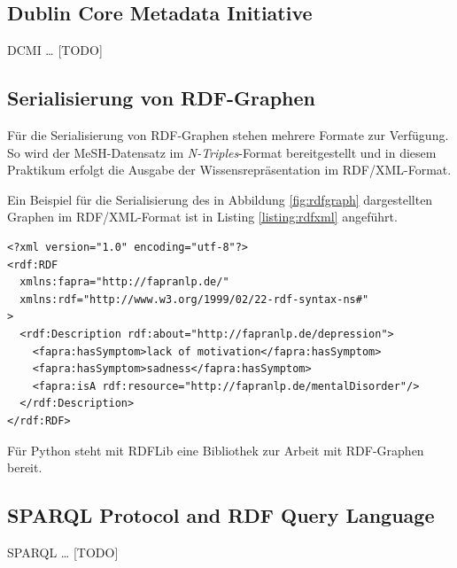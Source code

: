 \subsection{Dublin Core Metadata Initiative}
DCMI \dots{} [TODO]

\subsection{Serialisierung von RDF-Graphen}

Für die Serialisierung von RDF-Graphen stehen mehrere Formate zur Verfügung. So wird der MeSH-Datensatz im \emph{N-Triples}-Format bereitgestellt und in diesem Praktikum erfolgt die Ausgabe der Wissensrepräsentation im RDF/XML-Format.

Ein Beispiel für die Serialisierung des in Abbildung \ref{fig:rdfgraph} dargestellten Graphen im RDF/XML-Format ist in Listing \ref{listing:rdfxml} angeführt.

\lstset{language=XML, caption=RDF/XML, label=listing:rdfxml}
\begin{lstlisting}
<?xml version="1.0" encoding="utf-8"?>
<rdf:RDF
  xmlns:fapra="http://fapranlp.de/"
  xmlns:rdf="http://www.w3.org/1999/02/22-rdf-syntax-ns#"
>
  <rdf:Description rdf:about="http://fapranlp.de/depression">
    <fapra:hasSymptom>lack of motivation</fapra:hasSymptom>
    <fapra:hasSymptom>sadness</fapra:hasSymptom>
    <fapra:isA rdf:resource="http://fapranlp.de/mentalDisorder"/>
  </rdf:Description>
</rdf:RDF>
\end{lstlisting}




Für Python steht mit RDFLib \cite{rdflib_team_rdflib_2022} eine Bibliothek zur Arbeit mit RDF-Graphen bereit.

\subsection{SPARQL Protocol and RDF Query Language}
SPARQL \dots{} [TODO]